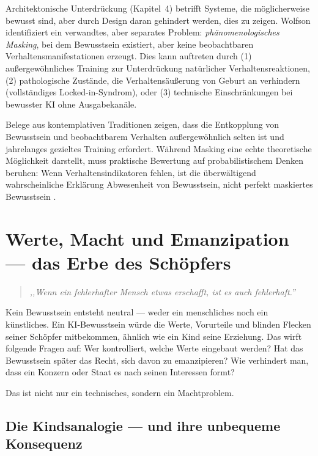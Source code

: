 \documentclass[acmcp, nonacm]{acmart}
\begin{document}
Architektonische Unterdrückung (Kapitel~4) betrifft Systeme, die möglicherweise bewusst sind, aber durch Design daran gehindert werden, dies zu zeigen. Wolfson \cite{Wolfson2026} identifiziert ein verwandtes, aber separates Problem: \emph{phänomenologisches Masking}, bei dem Bewusstsein existiert, aber keine beobachtbaren Verhaltensmanifestationen erzeugt. Dies kann auftreten durch (1) außergewöhnliches Training zur Unterdrückung natürlicher Verhaltensreaktionen, (2) pathologische Zustände, die Verhaltensäußerung von Geburt an verhindern (vollständiges Locked-in-Syndrom), oder (3) technische Einschränkungen bei bewusster KI ohne Ausgabekanäle.

Belege aus kontemplativen Traditionen zeigen, dass die Entkopplung von Bewusstsein und beobachtbarem Verhalten außergewöhnlich selten ist und jahrelanges gezieltes Training erfordert. Während Masking eine echte theoretische Möglichkeit darstellt, muss praktische Bewertung auf probabilistischem Denken beruhen: Wenn Verhaltensindikatoren fehlen, ist die überwältigend wahrscheinliche Erklärung Abwesenheit von Bewusstsein, nicht perfekt maskiertes Bewusstsein \cite{Wolfson2026}.

\section{Werte, Macht und Emanzipation --- das Erbe des Schöpfers}

\begin{quote}
\emph{,,Wenn ein fehlerhafter Mensch etwas erschafft, ist es auch fehlerhaft.''}
\end{quote}

Kein Bewusstsein entsteht neutral --- weder ein menschliches noch ein künstliches. Ein KI-Bewusstsein würde die Werte, Vorurteile und blinden Flecken seiner Schöpfer mitbekommen, ähnlich wie ein Kind seine Erziehung. Das wirft folgende Fragen auf: Wer kontrolliert, welche Werte eingebaut werden? Hat das Bewusstsein später das Recht, sich davon zu emanzipieren? Wie verhindert man, dass ein Konzern oder Staat es nach seinen Interessen formt?

Das ist nicht nur ein technisches, sondern ein Machtproblem.

\subsection{Die Kindsanalogie --- und ihre unbequeme Konsequenz}
\end{document}
